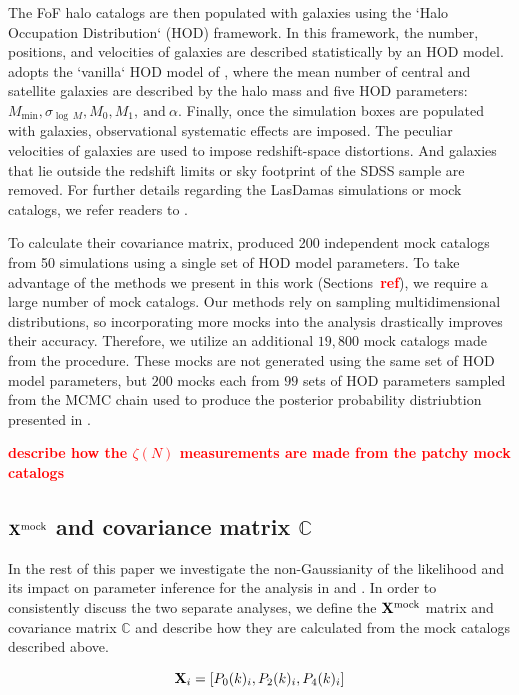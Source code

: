 \documentclass[12pt, letterpaper, preprint]{aastex}
\newcommand{\beq}{\begin{equation}}
\newcommand{\eeq}{\end{equation}}
\newcommand{\todo}[1]{{\bf \textcolor{red}{#1}}}
\begin{document}
The FoF halo catalogs are then populated with galaxies using the 
`Halo Occupation Distribution` (HOD) framework. In this framework, the 
number, positions, and velocities of galaxies are described statistically 
by an HOD model. \cite{sinha2017a} adopts the `vanilla` HOD model of \cite{zheng2007}, 
where the mean number of central and satellite galaxies are described by 
the halo mass and five HOD parameters: $M_\mathrm{min}, 
\sigma_{\log\,M} , M_0, M_1,~\mathrm{and}~\alpha$. Finally, once the 
simulation boxes are populated with galaxies, observational systematic 
effects are imposed. The peculiar velocities of galaxies are used to 
impose redshift-space distortions. And galaxies that lie outside the redshift
limits or sky footprint of the SDSS sample are removed. For further 
details regarding the LasDamas simulations or mock catalogs, we refer
readers to \cite{sinha2017a}.

To calculate their covariance matrix, \cite{sinha2017a} produced 200 
independent mock catalogs from 50 simulations using a single set of 
HOD model parameters. To take advantage of the methods we present 
in this work (Sections~\todo{ref}), we require a large number of 
mock catalogs. Our methods rely on sampling multidimensional distributions, 
so incorporating more mocks into the analysis drastically improves their 
accuracy. Therefore, we utilize an additional $19,800$ mock catalogs 
made from the procedure. These mocks are not generated using 
the same set of HOD model parameters, but $200$ mocks each from $99$ 
sets of HOD parameters sampled from the MCMC chain used to produce 
the posterior probability distriubtion presented in \cite{sinha2017a}. 

\todo{describe how the $\zeta(N)$ measurements are made from the patchy mock catalogs} 

\subsection{${\bf X}^\mathrm{mock}$ and covariance matrix $\mathbb{C}$}
In the rest of this paper we investigate the non-Gaussianity of the 
likelihood and its impact on parameter inference for the analysis in 
\cite{beutler2017} and \cite{sinha2017a}. In order to consistently discuss 
the two separate analyses, we define the ${\bf X}^\mathrm{mock}$ matrix 
and covariance matrix $\mathbb{C}$ and describe how they are calculated 
from the mock catalogs described above.


\beq
{\bf X}_i = [P_0(k)_i,P_2(k)_i,P_4(k)_i]
\eeq
\end{document}
